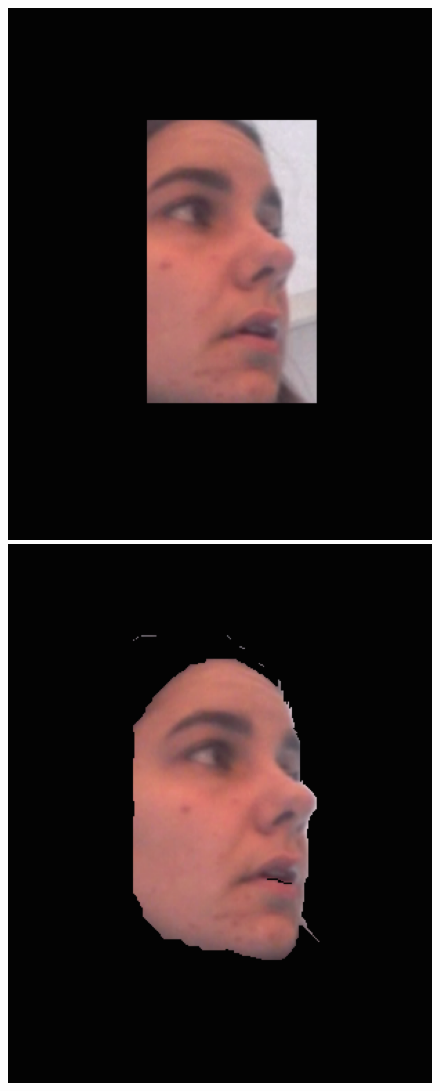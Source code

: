 \documentclass[10pt,twocolumn,letterpaper]{article}
\begin{document}
\begin{figure}
\begin{center}
	\includegraphics[scale=0.3]{figures/turn_bb}
	\includegraphics[scale=0.3]{figures/turn_segment}

\end{center}
\end{figure}
\end{document}
